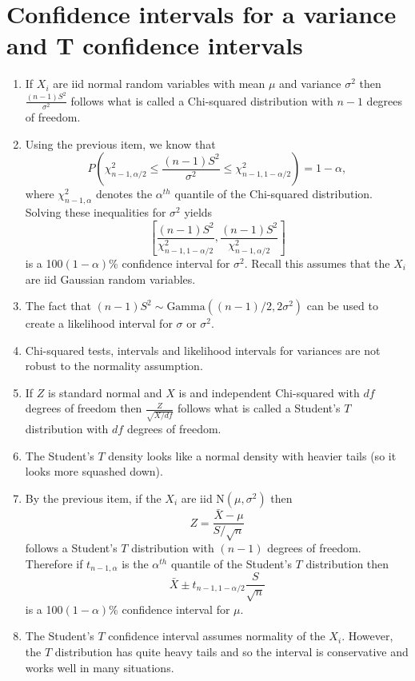 \documentclass[12pt]{article}
\begin{document}
\section{Confidence intervals for a variance and T confidence intervals}
\begin{enumerate}[1.]
\item If $X_i$ are iid normal random variables with mean $\mu$ and variance
  $\sigma^2$ then  $\frac{(n - 1)S^2}{\sigma^2}$
  follows what is called a Chi-squared distribution with $n-1$ degrees of freedom.
\item Using the previous item, we know that
  $$
  P\left(\chi^2_{n-1,\alpha/2} \leq \frac{(n-1)S^2}{\sigma^2} \leq \chi^2_{n-1,1-\alpha/2}
  \right) = 1 - \alpha,
  $$
  where $\chi^2_{n-1,\alpha}$ denotes the $\alpha^{th}$ quantile of the Chi-squared 
  distribution. Solving these inequalities for $\sigma^2$ yields
  $$
  \left[\frac{(n-1)S^2}{ \chi^2_{n-1,1-\alpha/2}},\frac{(n-1)S^2}{\chi^2_{n-1,\alpha/2}}\right]
  $$
  is a 100$(1 - \alpha)$\% confidence interval for $\sigma^2$. Recall this assumes that 
  the $X_i$ are iid Gaussian random variables.
\item The fact that $(n - 1) S^2 \sim \mbox{Gamma}((n - 1) / 2, 2\sigma^2)$ can 
  be used to create a likelihood interval for $\sigma$ or $\sigma^2$.
\item Chi-squared tests, intervals and likelihood intervals for
  variances are not robust to the normality assumption.
\item If $Z$ is standard normal and $X$ is and independent Chi-squared
  with $df$ degrees of freedom then $\frac{Z}{\sqrt{X / df}}$ follows
  what is called a Student's $T$ distribution with $df$ degrees of freedom.
\item The Student's $T$ density looks like a normal density with heavier
  tails (so it looks more squashed down).
\item By the previous item, if the $X_i$ are iid $\mathrm{N}(\mu,\sigma^2)$ then
  $$
  Z = \frac{\bar X - \mu}{S / \sqrt n}
  $$
  follows a Student's $T$ distribution with $(n-1)$ degrees of freedom. Therefore
  if $t_{n-1,\alpha}$ is the $\alpha^{th}$ quantile of the Student's $T$ distribution
  then 
  $$
  \bar X \pm t_{n-1,1-\alpha/2} \frac{S}{\sqrt{n}}
  $$
  is a 100$(1 - \alpha)$\% confidence interval for $\mu$.
\item The Student's $T$ confidence interval assumes normality of the
  $X_i$. However, the $T$ distribution has quite heavy tails and so the
  interval is conservative and works well in many situations.

\end{enumerate}
\end{document}
